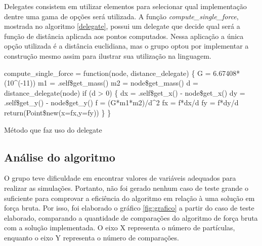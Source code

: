 \documentclass[rel_mlp]{iiufrgs}
\makeatletter
\newcommand{\nosemic}{\renewcommand{\@endalgocfline}{\relax}}%
\makeatother
\begin{document}
    Delegates consistem em utilizar elementos para selecionar qual implementação dentre uma gama
    de opções será utilizada.
    A função \textit{compute{\_}single{\_}force}, mostrada no algoritmo \ref{delegate}, possui um
    delegate que decide qual será a função de distância aplicada aos pontos computados. Nessa aplicação
    a única opção utilizada é a distância euclidiana, mas o grupo optou por implementar a construção
    mesmo assim para ilustrar sua utilização na linguagem.

\begin{algorithm}
\label{delegate}
\nosemic compute{\_}single{\_}force = function(node, distance{\_}delegate) {\{}\;
\nosemic  G = 6.67408*(10\string^(-11))\;
\nosemic  m1 = .self{\$}get{\_}mass()\;
\nosemic  m2 = node{\$}get{\_}mass()\;
\nosemic  d = distance{\_}delegate(node)\;
\nosemic  if (d > 0) {\{}\;
\nosemic    dx = .self{\$}get{\_}x() - node{\$}get{\_}x()\;
\nosemic    dy = .self{\$}get{\_}y() - node{\$}get{\_}y()\;
\nosemic    f = (G*m1*m2)/d\string^2\;
\nosemic    fx = f*dx/d\;
\nosemic    fy = f*dy/d\;
\nosemic    return(Point{\$}new(x=fx,y=fy))\;
\nosemic  {\}}\;
\nosemic {\}}\;
\caption{Método que faz uso do delegate}
\end{algorithm}


\subsection{Análise do algoritmo}

O grupo teve dificuldade em encontrar valores de variáveis adequados para realizar as simulações. Portanto,
não foi gerado nenhum caso de teste grande o suficiente para comprovar a eficiência do algoritmo em relação
à uma solução em força bruta. Por isso, foi elaborado o gráfico \ref{fig:grafico} a partir do caso de teste elaborado, comparando
a quantidade de comparações do algoritmo de força bruta com a solução implementada. O eixo X representa o número
de partículas, enquanto o eixo Y representa o número de comparações.
\end{document}
